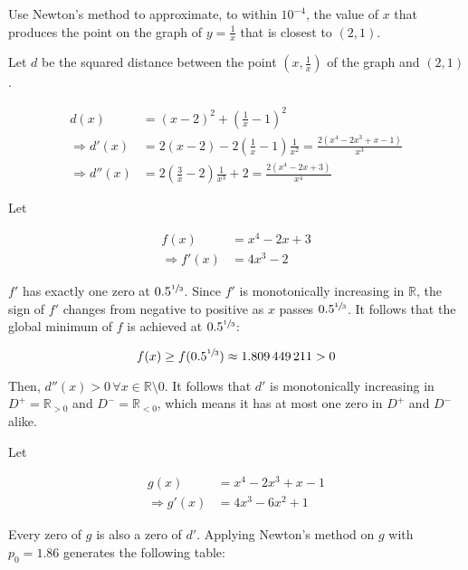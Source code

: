 \documentclass[../../../../Assignments]{subfiles}
\begin{document}
\begin{exercise}
    Use Newton's method to approximate, to within \(10^{-4}\), the value of
    \(x\) that produces the point on the graph of \(y = \frac{1}{x}\) that is
    closest to \((2, 1)\).
\end{exercise}

\begin{solution}
    Let \(d\) be the squared distance between the point \((x, \frac{1}{x})\) of
    the graph and \((2, 1)\).

    \begin{align*}
                      d(x) &= (x - 2)^2 + \left(\frac{1}{x} - 1\right)^2 \\
        \Rightarrow  d'(x) &= 2(x - 2) - 2 \left(\frac{1}{x} - 1\right) \frac{1}{x^2} = \frac{2(x^4 - 2x^3 + x - 1)}{x^3} \\
        \Rightarrow d''(x) &= 2 \left(\frac{3}{x} - 2\right) \frac{1}{x^3} + 2 = \frac{2(x^4 - 2x + 3)}{x^4}
    \end{align*}

    Let

    \begin{align*}
                     f(x) &= x^4 - 2x + 3 \\
        \Rightarrow f'(x) &= 4x^3 - 2
    \end{align*}

    \(f'\) has exactly one zero at \(\num{0.5}^{\sfrac{1}{3}}\). Since \(f'\) is
    monotonically increasing in \(\mathbb{R}\), the sign of \(f'\) changes from
    negative to positive as \(x\) passes \(\num{0.5}^{\sfrac{1}{3}}\). It
    follows that the global minimum of \(f\) is achieved at
    \(\num{0.5}^{\sfrac{1}{3}}\):

    \[f(x) \geq f(\num{0.5}^{\sfrac{1}{3}}) \approx \num{1.809449211} > 0\]

    Then, \(d''(x) > 0 \, \forall x \in \mathbb{R} \setminus {0}\). It follows
    that \(d'\) is monotonically increasing in \(D^+ = \mathbb{R}_{> 0}\) and
    \(D^- = \mathbb{R}_{< 0}\), which means it has at most one zero in \(D^+\)
    and \(D^-\) alike.

    Let

    \begin{align*}
                     g(x) &= x^4 - 2x^3 + x - 1 \\
        \Rightarrow g'(x) &= 4x^3 - 6x^2 + 1
    \end{align*}

    Every zero of \(g\) is also a zero of \(d'\). Applying Newton's method on
    \(g\) with \(p_0 = \num{1.86}\) generates the following table:


\end{solution}
\end{document}
